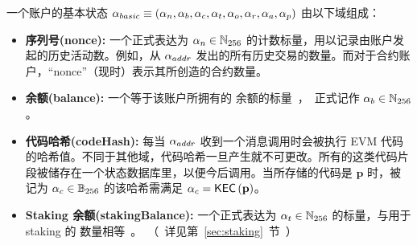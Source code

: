 一个账户的基本状态 $\mathbf{\alpha}_{basic} \equiv\left( \mathbf{\alpha}_n, \mathbf{\alpha}_b, \mathbf{\alpha}_c,\mathbf{\alpha}_t, \mathbf{\alpha}_o, \mathbf{\alpha}_r, \mathbf{\alpha}_a, \mathbf{\alpha}_p\right)$ 由以下域组成：
\begin{itemize}[nosep]
	\item {\bf 序列号(nonce):} 一个正式表达为 $\mathbf{\alpha}_n\in \mathbb{N}_{256}$ 的计数标量，用以记录由账户发起的历史活动数。例如，从 $\mathbf{\alpha}_{addr}$ 发出的所有历史交易的数量。而对于合约账户，“nonce”（现时）表示其所创造的合约数量。

	\item {\bf 余额(balance):} 一个等于该账户所拥有的 \unit 余额的标量，正式记作 $\mathbf{\alpha}_b\in \mathbb{N}_{256}$。

	\item {\bf 代码哈希(codeHash):} 每当 $\mathbf{\alpha}_{addr}$ 收到一个消息调用时会被执行 EVM 代码的哈希值。不同于其他域，代码哈希一旦产生就不可更改。所有的这类代码片段被储存在一个状态数据库里，以便今后调用。当所存储的代码是 $\mathbf{p}$ 时，被记为 $\mathbf{\alpha}_c\in \mathbb{B}_{256}$ 的该哈希需满足 $\mathbf{\alpha}_c=\mathsf{KEC}\left(\mathbf{p} \right)$。  

	\item {\bf Staking 余额(stakingBalance):} 一个正式表达为 $\mathbf{\alpha}_t\in \mathbb{N}_{256}$ 的标量，与用于 staking 的 \unit 数量相等。（详见第 \ref{sec:staking} 节）


\end{itemize}
